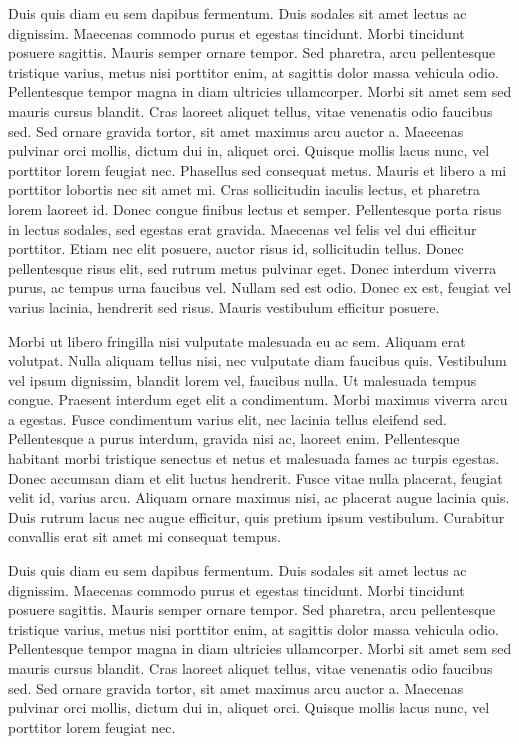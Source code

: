 Duis quis diam eu sem dapibus fermentum. Duis sodales sit amet lectus
ac dignissim. Maecenas commodo purus et egestas tincidunt. Morbi tincidunt
 posuere sagittis. Mauris semper ornare tempor. Sed pharetra, arcu pellentesque
 tristique varius, metus nisi porttitor enim, at sagittis dolor massa vehicula
 odio. Pellentesque tempor magna in diam ultricies ullamcorper. Morbi sit amet
 sem sed mauris cursus blandit. Cras laoreet aliquet tellus, vitae venenatis
 odio faucibus sed. Sed ornare gravida tortor, sit amet maximus arcu auctor
 a. Maecenas pulvinar orci mollis, dictum dui in, aliquet orci. Quisque mollis
 lacus nunc, vel porttitor lorem feugiat nec.
 Phasellus sed consequat metus. Mauris et libero a mi porttitor lobortis nec sit
amet mi. Cras sollicitudin iaculis lectus, et pharetra lorem laoreet id. Donec
congue finibus lectus et semper. Pellentesque porta risus in lectus sodales, sed
egestas erat gravida. Maecenas vel felis vel dui efficitur porttitor. Etiam nec
elit posuere, auctor risus id, sollicitudin tellus. Donec pellentesque risus
elit, sed rutrum metus pulvinar eget. Donec interdum viverra purus, ac tempus
urna faucibus vel. Nullam sed est odio. Donec ex est, feugiat vel varius
lacinia, hendrerit sed risus. Mauris vestibulum efficitur posuere.

Morbi ut libero fringilla nisi vulputate malesuada eu ac sem. Aliquam
erat volutpat. Nulla aliquam tellus nisi, nec vulputate diam faucibus
quis. Vestibulum vel ipsum dignissim, blandit lorem vel, faucibus nulla.
Ut malesuada tempus congue. Praesent interdum eget elit a condimentum.
Morbi maximus viverra arcu a egestas. Fusce condimentum varius elit,
nec lacinia tellus eleifend sed. Pellentesque a purus interdum, gravida
nisi ac, laoreet enim. Pellentesque habitant morbi tristique senectus
et netus et malesuada fames ac turpis egestas. Donec accumsan diam et
elit luctus hendrerit. Fusce vitae nulla placerat, feugiat velit id,
varius arcu. Aliquam ornare maximus nisi, ac placerat augue lacinia
quis. Duis rutrum lacus nec augue efficitur, quis pretium ipsum
vestibulum. Curabitur convallis erat sit amet mi consequat tempus.

Duis quis diam eu sem dapibus fermentum. Duis sodales sit amet lectus
ac dignissim. Maecenas commodo purus et egestas tincidunt. Morbi tincidunt
 posuere sagittis. Mauris semper ornare tempor. Sed pharetra, arcu pellentesque
 tristique varius, metus nisi porttitor enim, at sagittis dolor massa vehicula
 odio. Pellentesque tempor magna in diam ultricies ullamcorper. Morbi sit amet
 sem sed mauris cursus blandit. Cras laoreet aliquet tellus, vitae venenatis
 odio faucibus sed. Sed ornare gravida tortor, sit amet maximus arcu auctor
 a. Maecenas pulvinar orci mollis, dictum dui in, aliquet orci. Quisque mollis
 lacus nunc, vel porttitor lorem feugiat nec.